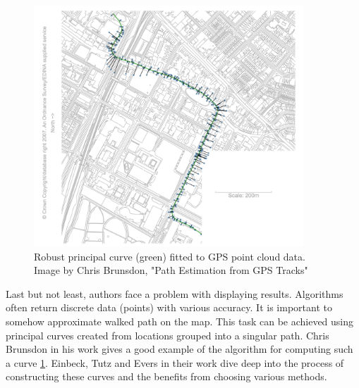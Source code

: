 \begin{figure}[]
    \includegraphics[width=0.9\textwidth]{images/article-map.png}
    \caption{Robust principal curve (green) fitted to GPS point cloud data. Image by Chris Brunsdon, "Path Estimation from GPS Tracks"}
    \label{fig:chrismap}
\end{figure}

Last but not least, authors face a problem with displaying results. Algorithms often return discrete data (points) with various accuracy. It is important to somehow approximate walked path on the map. This task can be achieved using principal curves created from locations grouped into a singular path. Chris Brunsdon in his work\cite{cb} gives a good example of the algorithm for computing such a curve \ref{fig:chrismap}. Einbeck, Tutz and Evers in their work\cite{ete} dive deep into the process of constructing these curves and the benefits from choosing various methods.
